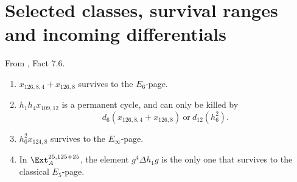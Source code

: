 \section{Selected classes, survival ranges and incoming differentials}

\begin{fact}
\label{paper:7.6}
From \cite{LWX126}, Fact 7.6.\par
\label{fact:theta5sqAF}
\begin{enumerate}
    \item $x_{126,8,4} + x_{126,8}$ survives to the $E_6$-page.
    
    \item $h_1h_4x_{109,12}$ is a permanent cycle, and can only be killed by 
    $$d_6(x_{126,8,4} + x_{126,8}) \ \text{or} \ d_{12}(h_6^2).$$
    
    \item $h_0^2x_{124,8}$ survives to the $E_\infty$-page.

    \item In $\Ext_A^{25,125+25}$, the element $g^4\Delta h_1g$ is the only one that survives to the classical $E_5$-page.
\end{enumerate}




\end{fact}
